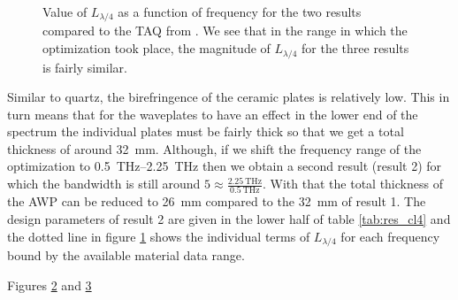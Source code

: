 \begin{figure}[ht]
    \centering
    
    \caption{Value of $L_{\lambda/4}$ as a function of frequency for the two results compared to the TAQ from \cite{Masson2006}. We see that in the range in which the optimization took place, the magnitude of $L_{\lambda/4}$ for the three results is fairly similar.}
    \label{fig:loss_function_cl4}
\end{figure}

Similar to quartz, the birefringence of the ceramic plates is relatively low. This in turn means that for the waveplates to have an effect in the lower end of the spectrum the individual plates must be fairly thick so that we get a total thickness of around \SI{32}{\milli \meter}. Although, if we shift the frequency range of the optimization to \SIrange[range-phrase=-, range-units=single]{0.5}{2.25}{\tera \hertz} then we obtain a second result (result 2) for which the bandwidth is still around $5\approx\frac{\SI{2.25}{\tera \hertz}}{\SI{0.5}{\tera \hertz}}$. With that the total thickness of the AWP can be reduced to \SI{26}{\milli \meter} compared to the \SI{32}{\milli \meter} of result 1. The design parameters of result 2 are given in the lower half of table \ref{tab:res_cl4} and the dotted line in figure \ref{fig:loss_function_cl4} shows the individual terms of $L_{\lambda/4}$ for each frequency bound by the available material data range. 



\begin{figure}[ht]
    \centering
    
    \caption{}
    \label{fig:cl4_pe_lp}
\end{figure}

\begin{figure}[ht]
    \centering
    
    \caption{}
    \label{fig:cl4_pe_cp}
\end{figure}

Figures \ref{fig:cl4_pe_lp} and \ref{fig:cl4_pe_cp} 

\begin{figure}[ht]
    \centering
    
    \caption{}
    \label{fig:cl4_degCirc}
\end{figure}

\begin{figure}[ht]
    \centering
    
    \caption{}
    \label{fig:cl4_degLin}
\end{figure}

